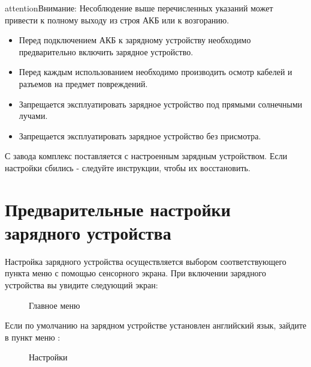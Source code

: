 \documentclass[a4paper,10pt,russian,openany]{sphinxmanual}
\let\sphinxpxdimen\pdfpxdimen\else\newdimen\sphinxpxdimen
\begin{document}
\begin{sphinxadmonition}{attention}{Внимание:}
Несоблюдение выше перечисленных указаний может привести к полному выходу из строя АКБ или к возгоранию.
\end{sphinxadmonition}

\begin{itemize}
\item {} 
Перед подключением АКБ к зарядному устройству необходимо предварительно включить зарядное устройство.

\item {} 
Перед каждым использованием необходимо производить осмотр кабелей и разъемов на предмет повреждений.

\item {} 
Запрещается эксплуатировать зарядное устройство под прямыми солнечными лучами.

\item {} 
Запрещается эксплуатировать зарядное устройство без присмотра.

\end{itemize}

С завода комплекс поставляется с настроенным зарядным устройством. Если настройки сбились - следуйте инструкции, чтобы их восстановить.


\section{Предварительные настройки зарядного устройства}
\label{\detokenize{charger:id3}}
Настройка зарядного устройства осуществляется выбором соответствующего пункта меню с помощью сенсорного экрана. При включении зарядного устройства вы увидите следующий экран:

\begin{figure}[H]
\centering
\capstart

\noindent\sphinxincludegraphics[width=470\sphinxpxdimen]{{charge1}.png}
\caption{Главное меню}\label{\detokenize{charger:id9}}\end{figure}

Если по умолчанию на зарядном устройстве установлен английский язык, зайдите в пункт меню :

\begin{figure}[H]
\centering
\capstart

\noindent\sphinxincludegraphics[width=470\sphinxpxdimen]{{lang1}.png}
\caption{Настройки}\label{\detokenize{charger:id10}}\end{figure}
\end{document}
